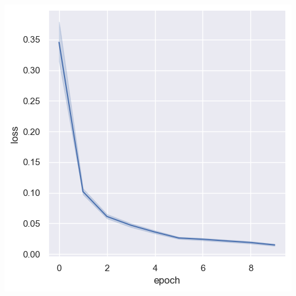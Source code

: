 \documentclass[a4paper, 11pt]{article}
\begin{document}
\begin{center}
\includegraphics[width=.9\linewidth]{./.ob-jupyter/98b946f3ee6dbe5becc443cc009687eff61363d4.png}
\end{center}
\end{document}
